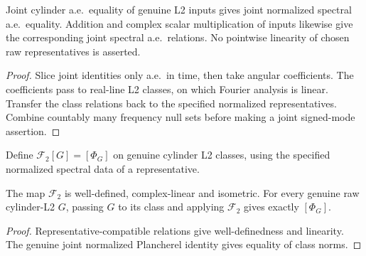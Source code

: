 \begin{lemma}
\label{lem:cylinder-fourier-relations}
\leanok
Joint cylinder a.e.\ equality of genuine L2 inputs gives joint normalized
spectral a.e.\ equality. Addition and complex scalar multiplication of inputs
likewise give the corresponding joint spectral a.e.\ relations.
No pointwise linearity of chosen raw representatives is asserted.
\end{lemma}

\begin{proof}
\leanok
Slice joint identities only a.e.\ in time, then take angular coefficients.
The coefficients pass to real-line L2 classes, on which Fourier analysis is linear.
Transfer the class relations back to the specified normalized representatives.
Combine countably many frequency null sets before making a joint signed-mode
assertion.
\end{proof}

\begin{definition}
\label{def:cylinder-fourier-l2}
\leanok
Define $\mathcal F_2[G]=[\Phi_G]$ on genuine cylinder L2 classes, using the
specified normalized spectral data of a representative.
\end{definition}

\begin{lemma}
\label{lem:cylinder-fourier-l2}
\leanok
The map $\mathcal F_2$ is well-defined, complex-linear and isometric.
For every genuine raw cylinder-L2 $G$, passing $G$ to its class and applying
$\mathcal F_2$ gives exactly $[\Phi_G]$.
\end{lemma}

\begin{proof}
\leanok
Representative-compatible relations give well-definedness and linearity.
The genuine joint normalized Plancherel identity gives equality of class norms.
\end{proof}

